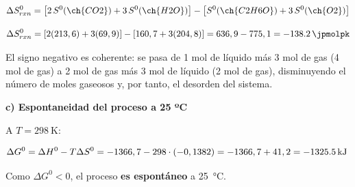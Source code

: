 \begin{exerciseEVAU}
\begin{solu}
        \begin{equation*}
            \Delta S^0_{rxn} = \left[ 2\, S^0 (\ch{CO2}) + 3\, S^0 (\ch{H2O}) \right] - \left[ S^0 (\ch{C2H6O}) + 3\, S^0 (\ch{O2}) \right]
        \end{equation*}

        \begin{equation*}
            \Delta S^0_{rxn} = \left[ 2(213,6) + 3(69,9) \right] - \left[ 160,7 + 3(204,8) \right] = 636,9 - 775,1 = \SI{-138.2}{\jpmolpk}
        \end{equation*}

        El signo negativo es coherente: se pasa de 1 mol de líquido más 3 mol de gas (4 mol de gas) a 2 mol de gas más 3 mol de líquido (2 mol de gas), disminuyendo el número de moles gaseosos y, por tanto, el desorden del sistema.

        \textbf{c) Espontaneidad del proceso a 25 ºC}

        A \(T = \SI{298}{\kelvin}\):

        \begin{equation*}
            \Delta G^0 = \Delta H^0 - T \Delta S^0 = -1366,7 - 298 \cdot (-0,1382) = -1366,7 + 41,2 = \energia[kj]{-1325.5}
        \end{equation*}

        Como \(\Delta G^0 < 0\), el proceso \textbf{es espontáneo} a \SI{25}{\celsius}.

    \end{solu}
\end{exerciseEVAU}

